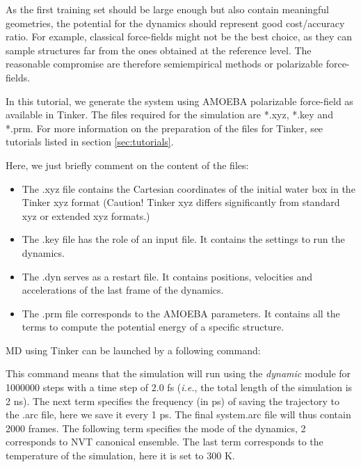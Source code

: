 \documentclass[12pt]{article}
\begin{document}

As the first training set should be large enough but also contain meaningful geometries, the potential for the dynamics should represent good cost/accuracy ratio. For example, classical force-fields might not be the best choice, as they can sample structures far from the ones obtained at the reference level. The reasonable compromise are therefore semiempirical methods or polarizable force-fields.

In this tutorial, we generate the system using AMOEBA polarizable force-field as available in Tinker. The files required for the simulation are *.xyz,  *.key and *.prm. For more information on the preparation of the files for Tinker, see tutorials listed in section \ref{sec:tutorials}.

Here, we just briefly comment on the content of the files:

\begin{itemize}
    \item The .xyz file contains the Cartesian coordinates of the initial water box in the Tinker xyz format (Caution! Tinker xyz differs significantly from standard xyz or extended xyz formats.)  
    \item The .key file has the role of an input file. It contains the settings to run the dynamics.
    \item The .dyn serves as a restart file. It contains positions, velocities and accelerations of the last frame of the dynamics.
    \item The .prm file corresponds to the AMOEBA parameters. It contains all the terms to compute the potential energy of a specific structure.
\end{itemize}

MD using Tinker can be launched by a following command:
\begin{center}
\end{center}
This command means that the simulation will run using the \textit{dynamic} module for 1000000 steps with a time step of 2.0 fs (\textit{i.e.}, the total length of the simulation is 2 ns). The next term specifies the frequency (in ps) of saving the trajectory to the .arc file, here we save it every 1 ps. The final system.arc file will thus contain 2000 frames. The following term specifies the mode of the dynamics, 2 corresponds to NVT canonical ensemble. The last term corresponds to the temperature of the simulation, here it is set to 300 K. 
\end{document}
